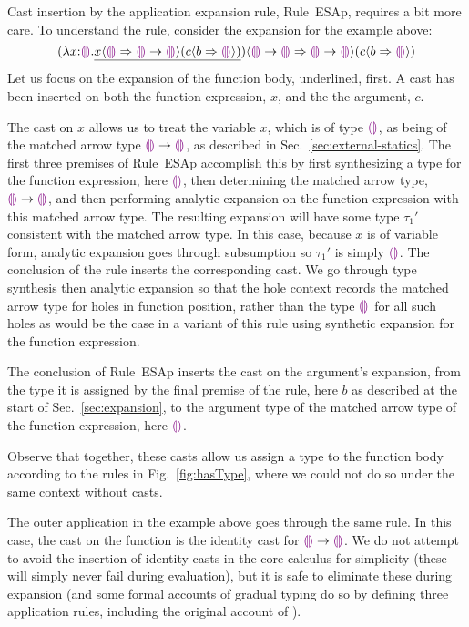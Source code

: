 Cast insertion by the application expansion rule, Rule~{ESAp}, requires a bit more care. 
To understand the rule, consider the expansion for the example above:
\[\hap{\dcasttwo{(\halam{x}{\tehole}{\underline{\hap{\dcasttwo{x}{\tehole}{\tarr{\tehole}{\tehole}}}{\dcasttwo{c}{b}{\tehole}}}})}{\tarr{\tehole}{\tehole}}{\tarr{\tehole}{\tehole}}}{\dcasttwo{c}{b}{\tehole}}
\]
Let us focus on the expansion of the function body, underlined, first. 
A cast has been inserted on both the function expression, $x$, and the the argument, $c$. 

The cast on $x$ allows us to treat the variable $x$, which is of type $\tehole$, as being of the matched arrow type $\tarr{\tehole}{\tehole}$, as described in Sec.~\ref{sec:external-statics}. 
The first three premises of Rule~{ESAp} accomplish this by first synthesizing a type for the function expression, here $\tehole$, then determining the matched arrow type, $\tarr{\tehole}{\tehole}$, and then performing analytic expansion on the function expression with this matched arrow type.
The resulting expansion will have some type $\tau_1'$ consistent with the matched arrow type. 
In this case, because $x$ is of variable form, analytic expansion goes through subsumption so $\tau_1'$ is simply $\tehole$. 
The conclusion of the rule inserts the corresponding cast. 
We go through type synthesis then analytic expansion so that the hole context records the matched arrow type for holes in function position, rather than the type $\tehole$ for all such holes as would be the case in a variant of this rule using synthetic expansion for the function expression.

The conclusion of Rule~{ESAp} inserts the cast on the argument's expansion, from the type it is assigned by the final premise of the rule, here $b$ as described at the start of Sec.~\ref{sec:expansion}, to the argument type of the matched arrow type of the function expression, here $\tehole$.

Observe that together, these casts allow us assign a type to the function body according to the rules in Fig.~\ref{fig:hasType}, where we could not do so under the same context without casts.

The outer application in the example above goes through the same rule. 
In this case, the cast on the function is the identity cast for $\tarr{\tehole}{\tehole}$. 
We do not attempt to avoid the insertion of identity casts in the core calculus for simplicity (these will simply never fail during evaluation), 
but it is safe to eliminate these during expansion (and some formal accounts of gradual typing do so by defining three application rules, including the original account of \cite{Siek06a}).


